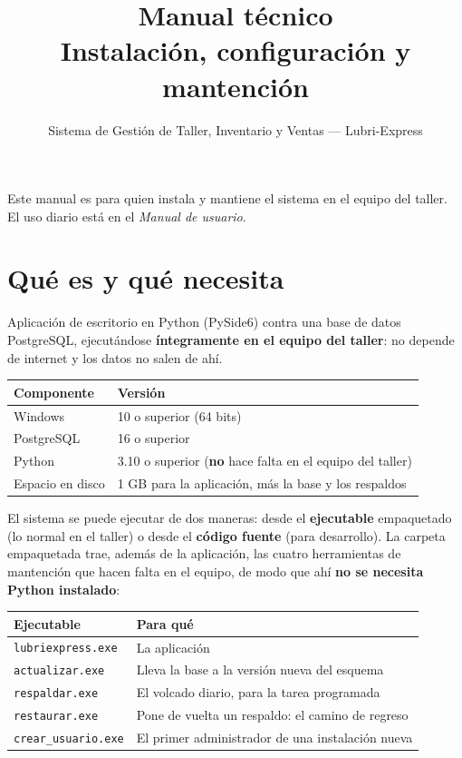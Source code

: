 \documentclass[11pt,a4paper]{article}
\title{\vspace{-1.5cm}\textbf{Manual técnico}\\[0.3cm]
       \large Instalación, configuración y mantención}
\author{Sistema de Gestión de Taller, Inventario y Ventas — Lubri-Express}
\date{}
\begin{document}
\maketitle
\thispagestyle{empty}

\noindent Este manual es para quien instala y mantiene el sistema en el equipo
del taller. El uso diario está en el \emph{Manual de usuario}.

\tableofcontents
\newpage

\section{Qué es y qué necesita}

Aplicación de escritorio en Python (PySide6) contra una base de datos
PostgreSQL, ejecutándose \textbf{íntegramente en el equipo del taller}: no
depende de internet y los datos no salen de ahí.

\begin{center}
\begin{tabular}{ll}
\toprule
\textbf{Componente} & \textbf{Versión} \\
\midrule
Windows & 10 o superior (64 bits) \\
PostgreSQL & 16 o superior \\
Python & 3.10 o superior (\textbf{no} hace falta en el equipo del taller) \\
Espacio en disco & 1 GB para la aplicación, más la base y los respaldos \\
\bottomrule
\end{tabular}
\end{center}

El sistema se puede ejecutar de dos maneras: desde el \textbf{ejecutable}
empaquetado (lo normal en el taller) o desde el \textbf{código fuente} (para
desarrollo). La carpeta empaquetada trae, además de la aplicación, las cuatro
herramientas de mantención que hacen falta en el equipo, de modo que ahí
\textbf{no se necesita Python instalado}:

\begin{center}
\begin{tabular}{ll}
\toprule
\textbf{Ejecutable} & \textbf{Para qué} \\
\midrule
\texttt{lubriexpress.exe} & La aplicación \\
\texttt{actualizar.exe} & Lleva la base a la versión nueva del esquema \\
\texttt{respaldar.exe} & El volcado diario, para la tarea programada \\
\texttt{restaurar.exe} & Pone de vuelta un respaldo: el camino de regreso \\
\texttt{crear\_usuario.exe} & El primer administrador de una instalación nueva \\
\bottomrule
\end{tabular}
\end{center}
\end{document}
